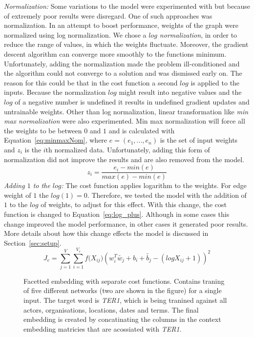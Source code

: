 \noindent
\emph{Normalization:} Some variations to the model were experimented with but because of extremely poor results were disregard. One of such approaches was normalization. In an attempt to boost performance, weights of the graph were normalized using log normalization. We chose a \emph{$log$ normalization}, in order to reduce the range of values, in which the weights fluctuate. Moreover, the gradient descent algorithm can converge more smoothly to the functions minimum. Unfortunately, adding the normalization made the problem ill-conditioned and the algorithm could not converge to a solution and was dismissed early on. The reason for this could be that in the cost function a second $log$ is applied to the inputs. Because the normalization $log$ might result into negative values and the $log$ of a negative number is undefined it results in undefined gradient updates and untrainable weights. Other than log normalization, linear transformation like \emph{min max normalization} were also experimented. Min max normalization will force all the weights to be between $0$ and $1$ and is calculated with Equation~\ref{eq:minmaxNom}, where $e=(e_1,...,e_n)$ is the set of input weights and $z_i$ is the $i$th normalized data. Unfortunately, adding this form of normalization did not improve the results and are also removed from the model.
\begin{equation}
z_{ i }=\frac { e_{ i }-min(e) }{ max(e)-min(e) } 
\label{eq:minmaxNom}
\end{equation}
\noindent
\emph{Adding $1$ to the $log$:} The cost function applies logarithm to the weights. For edge weight of $1$ the $log(1)=0$. Therefore, we tested the model with the addition of $1$ to the $log$ of weights, to adjust for this effect. With this change, the cost function is changed to Equation~\ref{eq:log_plus}. Although in some cases this change improved the model performance, in other cases it generated poor results. More details about how this change effects the model is discussed in Section~\ref{sec:setup}. 
\begin{equation}
J_e=\sum _{ j=1 }^{ V }{}\sum _{ i=1 }^{ V_e }{ f({ X }_{ ij } } )(w_{ i }^{ T }\tilde{  w_{ j } } +b_{ i }+\tilde{  b_{ j } } -(log{ X }_{ ij }+1))^2
\label{eq:log_plus}
\end{equation}
\begin{figure}
{\small 
{} %

}
\caption{Facetted embedding with separate cost functions. Contains traning of five different networks (two are shown in the figure) for a single input. The target word is \emph{TER1}, which is being tranined against all actors, organisations, locations, dates and terms. The final embedding is created by concatinating the columns in the context embedding matricies that are acossiated with \emph{TER1}.   } \label{fig:separate_cost}
\end{figure}
